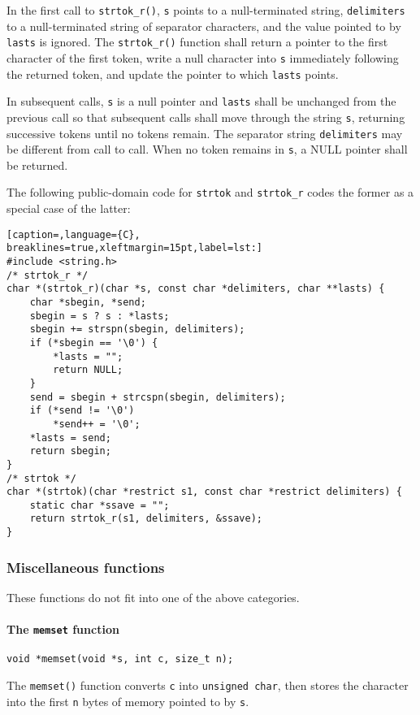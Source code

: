 In the first call to \texttt{strtok\_r()}, \texttt{s} points to a
null-terminated string, \texttt{delimiters} to a null-terminated string of
separator characters, and the value pointed to by \texttt{lasts} is ignored.
The \texttt{strtok\_r()} function shall return a pointer to the first character
of the first token, write a null character into \texttt{s} immediately
following the returned token, and update the pointer to which \texttt{lasts}
points.

In subsequent calls, \texttt{s} is a null pointer and \texttt{lasts} shall be
unchanged from the previous call so that subsequent calls shall move through
the string \texttt{s}, returning successive tokens until no tokens remain. The
separator string \texttt{delimiters} may be different from call to call. When
no token remains in \texttt{s}, a NULL pointer shall be returned.

The following public-domain code for \texttt{strtok} and \texttt{strtok\_r}
codes the former as a special case of the latter:
\lstset{basicstyle=\scriptsize, numbers=left, captionpos=b, tabsize=4}
\begin{lstlisting}[caption=,language={C},
breaklines=true,xleftmargin=15pt,label=lst:]
#include <string.h>
/* strtok_r */
char *(strtok_r)(char *s, const char *delimiters, char **lasts) {
	char *sbegin, *send;
	sbegin = s ? s : *lasts;
	sbegin += strspn(sbegin, delimiters);
	if (*sbegin == '\0') {
		*lasts = "";
		return NULL;
	}
	send = sbegin + strcspn(sbegin, delimiters);
	if (*send != '\0')
		*send++ = '\0';
	*lasts = send;
	return sbegin;
}
/* strtok */
char *(strtok)(char *restrict s1, const char *restrict delimiters) {
	static char *ssave = "";
	return strtok_r(s1, delimiters, &ssave);
}
\end{lstlisting}

\subsubsection{Miscellaneous functions}
These functions do not fit into one of the above categories.

\paragraph{The \texttt{memset} function}
\texttt{void *memset(void *s, int c, size\_t n);}

The \texttt{memset()} function converts \texttt{c} into \texttt{unsigned char},
then stores the character into the first \texttt{n} bytes of memory pointed to
by \texttt{s}.

